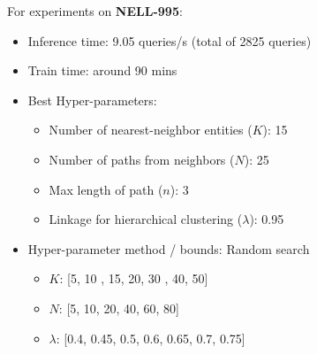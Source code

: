 \documentclass[11pt,a4paper]{article}
\newcommand{\nell}{NELL-995\xspace}
\begin{document}
For experiments on \textbf{\nell}:
\begin{itemize}
    \item Inference time: 9.05 queries/s (total of 2825 queries)
    \item Train time: around 90 mins
    \item Best Hyper-parameters: 
    \begin{itemize}
        \item Number of nearest-neighbor entities ($K$): 15
        \item Number of paths from neighbors ($N$): 25
        \item Max length of path ($n$): 3
        \item Linkage for hierarchical clustering ($\lambda$): 0.95
    \end{itemize}
    \item Hyper-parameter method / bounds: Random search
    \begin{itemize}
        \item $K$: [5, 10 , 15, 20, 30 , 40, 50]
        \item $N$: [5, 10, 20, 40, 60, 80]
        \item $\lambda$: [0.4, 0.45, 0.5, 0.6, 0.65, 0.7, 0.75]
    \end{itemize}
\end{itemize}

 
\end{document}
